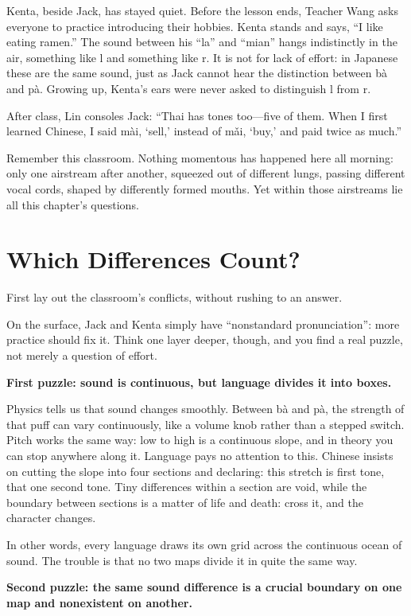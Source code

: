 Kenta, beside Jack, has stayed quiet. Before the lesson ends, Teacher Wang asks everyone to practice introducing their hobbies. Kenta stands and says, ``I like eating ramen.'' The sound between his ``la'' and ``mian'' hangs indistinctly in the air, something like l and something like r. It is not for lack of effort: in Japanese these are the same sound, just as Jack cannot hear the distinction between bà and pà. Growing up, Kenta's ears were never asked to distinguish l from r.

After class, Lin consoles Jack: ``Thai has tones too---five of them. When I first learned Chinese, I said mài, `sell,' instead of mǎi, `buy,' and paid twice as much.''

Remember this classroom. Nothing momentous has happened here all morning: only one airstream after another, squeezed out of different lungs, passing different vocal cords, shaped by differently formed mouths. Yet within those airstreams lie all this chapter's questions.

\section{Which Differences Count?}
First lay out the classroom's conflicts, without rushing to an answer.

On the surface, Jack and Kenta simply have ``nonstandard pronunciation'': more practice should fix it. Think one layer deeper, though, and you find a real puzzle, not merely a question of effort.

\textbf{First puzzle: sound is continuous, but language divides it into boxes.}

Physics tells us that sound changes smoothly. Between bà and pà, the strength of that puff can vary continuously, like a volume knob rather than a stepped switch. Pitch works the same way: low to high is a continuous slope, and in theory you can stop anywhere along it. Language pays no attention to this. Chinese insists on cutting the slope into four sections and declaring: this stretch is first tone, that one second tone. Tiny differences within a section are void, while the boundary between sections is a matter of life and death: cross it, and the character changes.

In other words, every language draws its own grid across the continuous ocean of sound. The trouble is that no two maps divide it in quite the same way.

\textbf{Second puzzle: the same sound difference is a crucial boundary on one map and nonexistent on another.}


